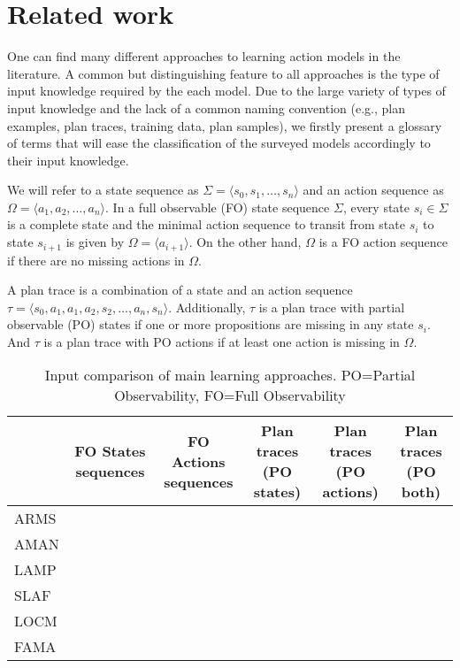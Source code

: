 
\section{Related work}
\label{sec:Section2}


One can find many different approaches to learning action models in the literature. A common but distinguishing feature to all approaches is the type of input knowledge required by the each model. Due to the large variety of types of input knowledge and the lack of a common naming convention (e.g., plan examples, plan traces, training data, plan samples), we firstly present a glossary of terms that will ease the classification of the surveyed models accordingly to their input knowledge.

We will refer to a state sequence as $\Sigma = \langle s_0, s_1, \ldots, s_n \rangle$ and an action sequence as $\Omega = \langle a_1, a_2, \ldots, a_n \rangle$. In a full observable (FO) state sequence $\Sigma$, every state $s_i \in \Sigma$ is a complete state and the minimal action sequence to transit from state $s_i$ to state $s_{i+1}$  is given by $\Omega = \langle a_{i+1} \rangle$. On the other hand, $\Omega$ is a FO action sequence if there are no missing actions in $\Omega$.

A plan trace is a combination of a state and an action sequence $\tau = \langle s_0, a_1, a_1, a_2, s_2, \ldots, a_n, s_n \rangle$. Additionally, $\tau$ is a plan trace with partial observable (PO) states if one or more propositions are missing in any state $s_i$. And $\tau$ is a plan trace with PO actions if at least one action is missing in $\Omega$.


\begin{table}
	\small
	\centering
	\begin{tabular}{ l | c | c | c | c | c |}
		& \multicolumn{1}{|p{2cm}|}{FO States sequences}
		& \multicolumn{1}{|p{2cm}|}{FO Actions sequences}
		& \multicolumn{1}{|p{2cm}|}{Plan traces (PO states)}
		& \multicolumn{1}{|p{2cm}|}{Plan traces (PO actions)}
		& \multicolumn{1}{|p{2cm}|}{Plan traces (PO both)}   \\
		\hline			
		ARMS &  & \checkmark & \checkmark & & \\
		AMAN & & & \checkmark & &\\
		LAMP & & & \checkmark & &\\
		SLAF & & & \checkmark & &\\
		LOCM & & \checkmark & & &\\
		FAMA & \checkmark & \checkmark &  \checkmark & \checkmark & \checkmark \\
	\end{tabular}
	\caption{Input comparison of main learning approaches. PO=Partial Observability, FO=Full Observability}
	\label{table:input_comparison}
\end{table}	


